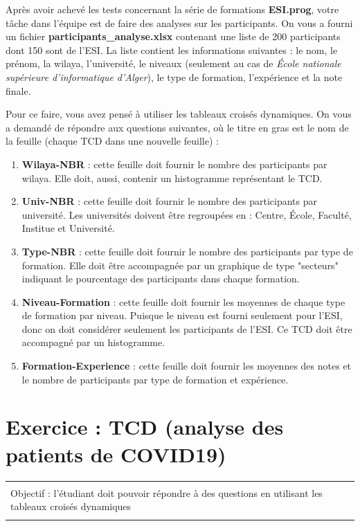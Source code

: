 \documentclass[11pt, a4paper]{article}
\begin{document}
Après avoir achevé les tests concernant la série de formations \textbf{ESI.prog}, votre tâche dans l'équipe est de faire des analyses sur les participants. 
On vous a fourni un fichier \textbf{participants\_analyse.xlsx} contenant une liste de 200 participants dont 150 sont de l'ESI. 
La liste contient les informations suivantes : le nom, le prénom, la wilaya, l'université, le niveaux (seulement au cas de \textit{École nationale supérieure d'informatique d'Alger}), le type de formation, l'expérience et la note finale. 

Pour ce faire, vous avez pensé à utiliser les tableaux croisés dynamiques. 
On vous a demandé de répondre aux questions suivantes, où le titre en gras est le nom de la feuille (chaque TCD dans une nouvelle feuille) : 

\begin{enumerate}
	\item \textbf{Wilaya-NBR} : cette feuille doit fournir le nombre des participants par wilaya. Elle doit, aussi, contenir un histogramme représentant le TCD. 
	\item \textbf{Univ-NBR} : cette feuille doit fournir le nombre des participants par université. Les universités doivent être regroupées en : Centre, École, Faculté, Institue et Université.
	\item \textbf{Type-NBR} : cette feuille doit fournir le nombre des participants par type de formation. Elle doit être accompagnée par un graphique de type "secteurs" indiquant le pourcentage des participants dans chaque formation.
	\item \textbf{Niveau-Formation} : cette feuille doit fournir les moyennes de chaque type de formation par niveau. Puisque le niveau est fourni seulement pour l'ESI, donc on doit considérer seulement les participants de l'ESI.
	Ce TCD doit être accompagné par un histogramme. 
	\item \textbf{Formation-Experience} : cette feuille doit fournir les moyennes des notes et le nombre de participants par type de formation et expérience.
\end{enumerate}


\section*{Exercice : TCD (analyse des patients de COVID19)}

\vspace{-12pt}
\begin{tabular}{|p{\textwidth}|}
	\hline\\
	Objectif : l'étudiant doit pouvoir répondre à des questions en utilisant les tableaux croisés dynamiques  \\\\
	\hline
\end{tabular}
\end{document}
